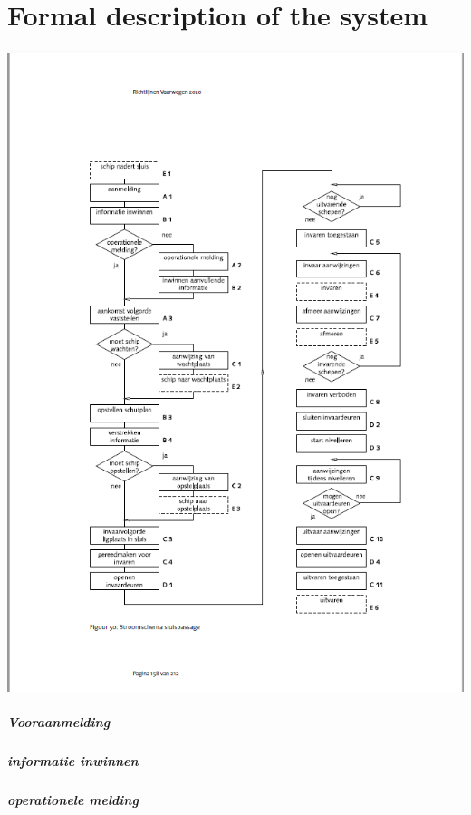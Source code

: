 \chapter{Formal description of the system}

\includegraphics[scale=0.65]{sluispassage.png}

\paragraph{Vooraanmelding}


\paragraph{informatie inwinnen}


\paragraph{operationele melding}


